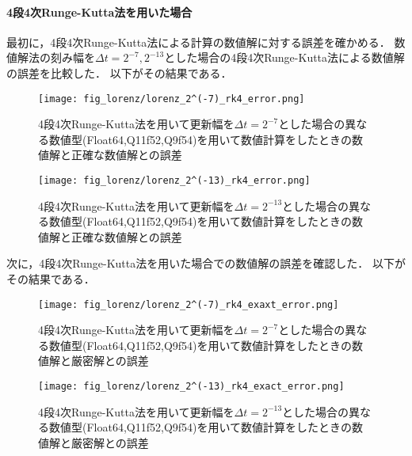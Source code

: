 \paragraph*{4段4次Runge-Kutta法を用いた場合}
最初に，4段4次Runge-Kutta法による計算の数値解に対する誤差を確かめる．
数値解法の刻み幅を$\Delta t = 2^{-7},2^{-13}$とした場合の4段4次Runge-Kutta法による数値解の誤差を比較した．
以下がその結果である．
\begin{figure}[H]
    \centering
    \begin{minipage}[b]{0.49\columnwidth}
        \centering
        \texttt{[image: fig\_lorenz/lorenz\_2^(-7)\_rk4\_error.png]}
        \caption{4段4次Runge-Kutta法を用いて更新幅を$\Delta t = 2^{-7}$とした場合の異なる数値型(Float64,Q11f52,Q9f54)を用いて数値計算をしたときの数値解と正確な数値解との誤差}
        \label{fig:lorenz_2^(-7)_rk4_error}
    \end{minipage}
    \begin{minipage}[b]{0.49\columnwidth}
        \centering
        \texttt{[image: fig\_lorenz/lorenz\_2^(-13)\_rk4\_error.png]}
        \caption{4段4次Runge-Kutta法を用いて更新幅を$\Delta t =  2^{-13}$とした場合の異なる数値型(Float64,Q11f52,Q9f54)を用いて数値計算をしたときの数値解と正確な数値解との誤差}
        \label{fig:lorenz_2^(-13)_rk4_error}
    \end{minipage}
\end{figure}
次に，4段4次Runge-Kutta法を用いた場合での数値解の誤差を確認した．
以下がその結果である．
\begin{figure}[H]
    \centering
    \begin{minipage}[b]{0.49\columnwidth}
        \centering
        \texttt{[image: fig\_lorenz/lorenz\_2^(-7)\_rk4\_exaxt\_error.png]}
        \caption{4段4次Runge-Kutta法を用いて更新幅を$\Delta t = 2^{-7}$とした場合の異なる数値型(Float64,Q11f52,Q9f54)を用いて数値計算をしたときの数値解と厳密解との誤差}
        \label{fig:lorenz_2^(-7)_exact_error}
    \end{minipage}
    \begin{minipage}[b]{0.49\columnwidth}
        \centering
        \texttt{[image: fig\_lorenz/lorenz\_2^(-13)\_rk4\_exact\_error.png]}
        \caption{4段4次Runge-Kutta法を用いて更新幅を$\Delta t =  2^{-13}$とした場合の異なる数値型(Float64,Q11f52,Q9f54)を用いて数値計算をしたときの数値解と厳密解との誤差}
        \label{fig:lorenz_2^(-13)_exact_error}
    \end{minipage}
\end{figure}

